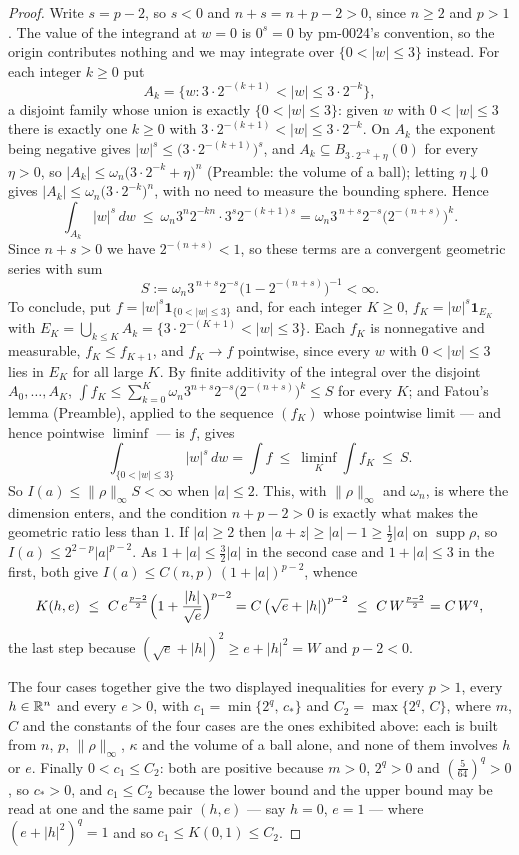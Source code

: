 \begin{proof}
Write $s=p-2$, so $s<0$ and $n+s=n+p-2>0$, since $n\ge2$ and $p>1$.  The value
of the integrand at $w=0$ is $0^{s}=0$ by pm-0024's convention, so the origin
contributes nothing and we may integrate over $\{0<|w|\le3\}$ instead.  For each
integer $k\ge0$ put
\[
A_k=\bigl\{w:3\cdot2^{-(k+1)}<|w|\le3\cdot2^{-k}\bigr\} ,
\]
a disjoint family whose union is exactly $\{0<|w|\le3\}$: given $w$ with
$0<|w|\le3$ there is exactly one $k\ge0$ with
$3\cdot2^{-(k+1)}<|w|\le3\cdot2^{-k}$.  On $A_k$ the exponent being negative
gives $|w|^{s}\le\bigl(3\cdot2^{-(k+1)}\bigr)^{s}$, and
$A_k\subseteq B_{3\cdot2^{-k}+\eta}(0)$ for every $\eta>0$, so
$|A_k|\le\omega_n\bigl(3\cdot2^{-k}+\eta\bigr)^n$ (Preamble: the volume of a
ball); letting $\eta\downarrow0$ gives
$|A_k|\le\omega_n\bigl(3\cdot2^{-k}\bigr)^n$, with no need to measure the
bounding sphere.
Hence
\[
\int_{A_k}|w|^{s}\,dw
\ \le\ \omega_n3^{n}2^{-kn}\cdot3^{s}2^{-(k+1)s}
=\omega_n3^{\,n+s}2^{-s}\bigl(2^{-(n+s)}\bigr)^{k} .
\]
Since $n+s>0$ we have $2^{-(n+s)}<1$, so these terms are a convergent geometric
series with sum
\[
S:=\omega_n3^{\,n+s}2^{-s}\bigl(1-2^{-(n+s)}\bigr)^{-1}<\infty .
\]
To conclude, put $f=|w|^{s}\mathbf1_{\{0<|w|\le3\}}$ and, for each integer $K\ge0$,
$f_K=|w|^{s}\mathbf1_{E_K}$ with $E_K=\bigcup_{k\le K}A_k
=\{3\cdot2^{-(K+1)}<|w|\le3\}$.  Each $f_K$ is nonnegative and measurable,
$f_K\le f_{K+1}$, and $f_K\to f$ pointwise, since every $w$ with $0<|w|\le3$
lies in $E_K$ for all large $K$.  By finite additivity of the integral over the
disjoint $A_0,\dots,A_K$, $\int f_K\le\sum_{k=0}^{K}\omega_n3^{n+s}2^{-s}
\bigl(2^{-(n+s)}\bigr)^{k}\le S$ for every $K$; and Fatou's lemma (Preamble),
applied to the sequence $(f_K)$ whose pointwise limit --- and hence pointwise
$\liminf$ --- is $f$, gives
\[
\int_{\{0<|w|\le3\}}|w|^{s}\,dw=\int f\ \le\ \liminf_K\int f_K\ \le\ S .
\]
So $I(a)\le\|\rho\|_\infty S<\infty$ when $|a|\le2$.  This, with
$\|\rho\|_\infty$ and $\omega_n$, is where the dimension enters, and the
condition $n+p-2>0$ is exactly what makes the geometric ratio less than $1$.  If $|a|\ge2$ then $|a+z|\ge|a|-1\ge\tfrac12|a|$ on
$\operatorname{supp}\rho$, so $I(a)\le2^{2-p}|a|^{p-2}$.  As $1+|a|\le\tfrac32|a|$
in the second case and $1+|a|\le3$ in the first, both give
$I(a)\le C(n,p)\,(1+|a|)^{p-2}$, whence
\[
K(h,e)\ \le\ C\,e^{\frac{p-2}2}\Bigl(1+\frac{|h|}{\sqrt e}\Bigr)^{p-2}
=C\,\bigl(\sqrt e+|h|\bigr)^{p-2}\ \le\ C\,W^{\frac{p-2}2}=C\,W^q ,
\]
the last step because $(\sqrt e+|h|)^2\ge e+|h|^2=W$ and $p-2<0$.

The four cases together give the two displayed inequalities for every $p>1$,
every $h\in\mathbb{R}^n$ and every $e>0$, with
$c_1=\min\{2^q,\,c_\ast\}$ and
$C_2=\max\{2^q,\,C\}$, where $m$, $C$ and the constants of the four cases are
the ones exhibited above: each is built from $n$, $p$, $\|\rho\|_\infty$,
$\kappa$ and the volume of a ball alone, and none of them involves $h$ or $e$.
Finally $0<c_1\le C_2$: both are positive because $m>0$, $2^q>0$ and
$(\tfrac5{64})^q>0$, so $c_\ast>0$, and $c_1\le C_2$ because the lower bound and the upper
bound may be read at one and the same pair $(h,e)$ --- say $h=0$, $e=1$ --- where
$(e+|h|^2)^q=1$ and so $c_1\le K(0,1)\le C_2$.
\end{proof}
